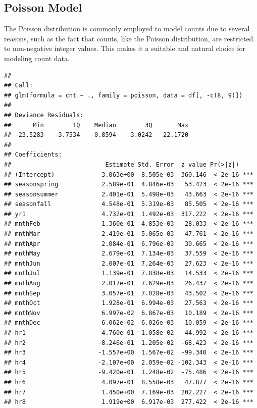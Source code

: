 \documentclass[
]{article}
\begin{document}
\hypertarget{poisson-model}{%
\subsection{Poisson Model}\label{poisson-model}}

The Poisson distribution is commonly employed to model counts due to
several reasons, such as the fact that counts, like the Poisson
distribution, are restricted to non-negative integer values. This makes
it a suitable and natural choice for modeling count data.

\begin{verbatim}
## 
## Call:
## glm(formula = cnt ~ ., family = poisson, data = df[, -c(8, 9)])
## 
## Deviance Residuals: 
##      Min        1Q    Median        3Q       Max  
## -23.5283   -3.7534   -0.8594    3.0242   22.1720  
## 
## Coefficients:
##                          Estimate Std. Error  z value Pr(>|z|)    
## (Intercept)             3.063e+00  8.505e-03  360.146  < 2e-16 ***
## seasonspring            2.589e-01  4.846e-03   53.423  < 2e-16 ***
## seasonsummer            2.401e-01  5.498e-03   43.663  < 2e-16 ***
## seasonfall              4.548e-01  5.319e-03   85.505  < 2e-16 ***
## yr1                     4.732e-01  1.492e-03  317.222  < 2e-16 ***
## mnthFeb                 1.360e-01  4.853e-03   28.033  < 2e-16 ***
## mnthMar                 2.419e-01  5.065e-03   47.761  < 2e-16 ***
## mnthApr                 2.084e-01  6.796e-03   30.665  < 2e-16 ***
## mnthMay                 2.679e-01  7.134e-03   37.559  < 2e-16 ***
## mnthJun                 2.007e-01  7.264e-03   27.623  < 2e-16 ***
## mnthJul                 1.139e-01  7.838e-03   14.533  < 2e-16 ***
## mnthAug                 2.017e-01  7.629e-03   26.437  < 2e-16 ***
## mnthSep                 3.057e-01  7.028e-03   43.502  < 2e-16 ***
## mnthOct                 1.928e-01  6.994e-03   27.563  < 2e-16 ***
## mnthNov                 6.997e-02  6.867e-03   10.189  < 2e-16 ***
## mnthDec                 6.062e-02  6.026e-03   10.059  < 2e-16 ***
## hr1                    -4.760e-01  1.058e-02  -44.992  < 2e-16 ***
## hr2                    -8.246e-01  1.205e-02  -68.423  < 2e-16 ***
## hr3                    -1.557e+00  1.567e-02  -99.340  < 2e-16 ***
## hr4                    -2.107e+00  2.059e-02 -102.343  < 2e-16 ***
## hr5                    -9.420e-01  1.248e-02  -75.486  < 2e-16 ***
## hr6                     4.097e-01  8.558e-03   47.877  < 2e-16 ***
## hr7                     1.450e+00  7.169e-03  202.227  < 2e-16 ***
## hr8                     1.919e+00  6.917e-03  277.422  < 2e-16 ***

\end{verbatim}
\end{document}
